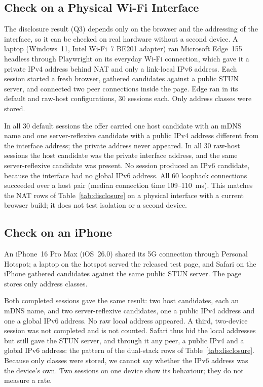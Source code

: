 \documentclass[conference]{IEEEtran}
\begin{document}
\subsection{Check on a Physical Wi-Fi Interface}
\label{sec:realhost}
The disclosure result (Q3) depends only on the browser and the addressing of the interface, so it can be checked on real hardware without a second device. A laptop (Windows~11, Intel Wi-Fi~7 BE201 adapter) ran Microsoft Edge~155 headless through Playwright on its everyday Wi-Fi connection, which gave it a private IPv4 address behind NAT and only a link-local IPv6 address. Each session started a fresh browser, gathered candidates against a public STUN server, and connected two peer connections inside the page. Edge ran in its default and raw-host configurations, 30 sessions each. Only address classes were stored.

In all 30 default sessions the offer carried one host candidate with an mDNS name and one server-reflexive candidate with a public IPv4 address different from the interface address; the private address never appeared. In all 30 raw-host sessions the host candidate was the private interface address, and the same server-reflexive candidate was present. No session produced an IPv6 candidate, because the interface had no global IPv6 address. All 60 loopback connections succeeded over a host pair (median connection time 109--110~ms). This matches the NAT rows of Table~\ref{tab:disclosure} on a physical interface with a current browser build; it does not test isolation or a second device.

\subsection{Check on an iPhone}
\label{sec:iphone}
An iPhone~16 Pro Max (iOS~26.0) shared its 5G connection through Personal Hotspot; a laptop on the hotspot served the released test page, and Safari on the iPhone gathered candidates against the same public STUN server. The page stores only address classes.

Both completed sessions gave the same result: two host candidates, each an mDNS name, and two server-reflexive candidates, one a public IPv4 address and one a global IPv6 address. No raw local address appeared. A third, two-device session was not completed and is not counted. Safari thus hid the local addresses but still gave the STUN server, and through it any peer, a public IPv4 and a global IPv6 address: the pattern of the dual-stack rows of Table~\ref{tab:disclosure}. Because only classes were stored, we cannot say whether the IPv6 address was the device's own. Two sessions on one device show its behaviour; they do not measure a rate.
\end{document}
